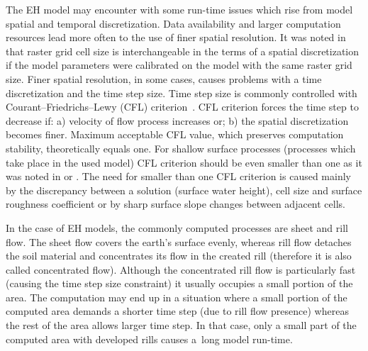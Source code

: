 The EH model may encounter with some run-time issues which 
rise from model spatial and temporal discretization. 
Data availability and larger computation resources lead more often 
to the use of finer spatial resolution. 
It was noted in \cite{molnar2000} that raster grid cell size is interchangeable 
in the terms of a spatial discretization if the model parameters 
were calibrated on the model with the same raster grid size. 
Finer spatial resolution, in some 
cases, causes problems with a time discretization and the time step size. 
Time step size is commonly 
controlled with Courant--Friedrichs--Lewy (CFL) criterion~\cite{courant1928}. 
CFL criterion forces the time step to decrease if: a) velocity of flow 
process increases or; b) the spatial discretization becomes finer. 
Maximum acceptable CFL value, which preserves computation stability, theoretically equals one. 
For shallow surface processes (processes which take place in the used model)
CFL criterion should 
be even smaller than one as it was noted in \cite{zhang1989}
or \cite{esteves2000}. The need for smaller than one CFL criterion 
is caused mainly by the discrepancy between a solution (surface water height), 
cell size and surface roughness coefficient 
or by sharp surface slope changes between adjacent cells. 

In the case of EH models, the commonly computed processes are sheet 
and 
rill flow. 
The sheet flow covers the earth's surface evenly, whereas rill flow detaches 
the soil material and concentrates its flow in the created rill 
(therefore it is also called concentrated flow).
Although the concentrated rill flow is particularly fast (causing  
the time step size constraint) it usually occupies a small portion of the area. 
The computation may end up in a situation where a 
small portion of the computed area demands a shorter time step 
(due to rill flow presence) whereas the rest of the area allows larger time step. 
In that case, only a small part of the computed area with developed rills causes a~long model run-time. 


